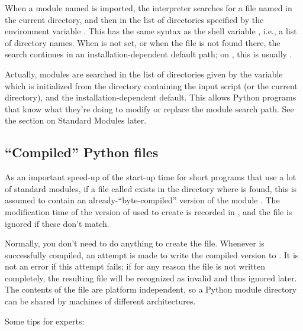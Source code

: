 \documentclass{manual}
\begin{document}
When a module named  is imported, the interpreter searches
for a file named  in the current directory,
and then in the list of directories specified by
the environment variable .  This has the same syntax as
the shell variable , i.e., a list of
directory names.  When  is not set, or when the file
is not found there, the search continues in an installation-dependent
default path; on \UNIX{}, this is usually .

Actually, modules are searched in the list of directories given by the 
variable  which is initialized from the directory 
containing the input script (or the current directory),
 and the installation-dependent default.  This allows
Python programs that know what they're doing to modify or replace the 
module search path.  See the section on Standard Modules later.

\subsection{``Compiled'' Python files}

As an important speed-up of the start-up time for short programs that
use a lot of standard modules, if a file called  exists
in the directory where  is found, this is assumed to
contain an already-``byte-compiled'' version of the module .
The modification time of the version of  used to create
 is recorded in , and the
 file is ignored if these don't match.

Normally, you don't need to do anything to create the
 file.  Whenever  is successfully
compiled, an attempt is made to write the compiled version to
.  It is not an error if this attempt fails; if for any
reason the file is not written completely, the resulting
 file will be recognized as invalid and thus ignored
later.  The contents of the  file are platform
independent, so a Python module directory can be shared by machines of
different architectures.

Some tips for experts:
\end{document}
